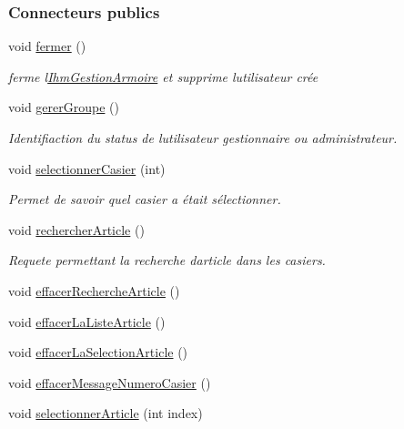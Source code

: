 \subsubsection*{Connecteurs publics}
\begin{DoxyCompactItemize}
\item 
void \hyperlink{class_ihm_gestion_armoire_a7fef1d21e4dcce9c4550d33b15e8dc29}{fermer} ()
\begin{DoxyCompactList}\small\item\em ferme l\textquotesingle{}\hyperlink{class_ihm_gestion_armoire}{Ihm\+Gestion\+Armoire} et supprime l\textquotesingle{}utilisateur crée \end{DoxyCompactList}\item 
void \hyperlink{class_ihm_gestion_armoire_a4cd664c766e29593d3fedf2baea6a330}{gerer\+Groupe} ()
\begin{DoxyCompactList}\small\item\em Identifiaction du status de l\textquotesingle{}utilisateur gestionnaire ou administrateur. \end{DoxyCompactList}\item 
void \hyperlink{class_ihm_gestion_armoire_ac2e2365408fcbf66c0e75bb828b40162}{selectionner\+Casier} (int)
\begin{DoxyCompactList}\small\item\em Permet de savoir quel casier a était sélectionner. \end{DoxyCompactList}\item 
void \hyperlink{class_ihm_gestion_armoire_a594f25b58b70700e19e3e7f567325c40}{rechercher\+Article} ()
\begin{DoxyCompactList}\small\item\em Requete permettant la recherche d\textquotesingle{}article dans les casiers. \end{DoxyCompactList}\item 
void \hyperlink{class_ihm_gestion_armoire_a71c12ea50f463c14c835b02d3db22025}{effacer\+Recherche\+Article} ()
\item 
void \hyperlink{class_ihm_gestion_armoire_a65cf47ddfe3942435b5f3bf40578d96a}{effacer\+La\+Liste\+Article} ()
\item 
void \hyperlink{class_ihm_gestion_armoire_aa432c67c648097bbec288694077d83e6}{effacer\+La\+Selection\+Article} ()
\item 
void \hyperlink{class_ihm_gestion_armoire_a38dab807125ddb3baecf9345906e3c4b}{effacer\+Message\+Numero\+Casier} ()
\item 
void \hyperlink{class_ihm_gestion_armoire_a28970b692994ad7201c03decd42ec0e5}{selectionner\+Article} (int index)
\end{DoxyCompactItemize}
